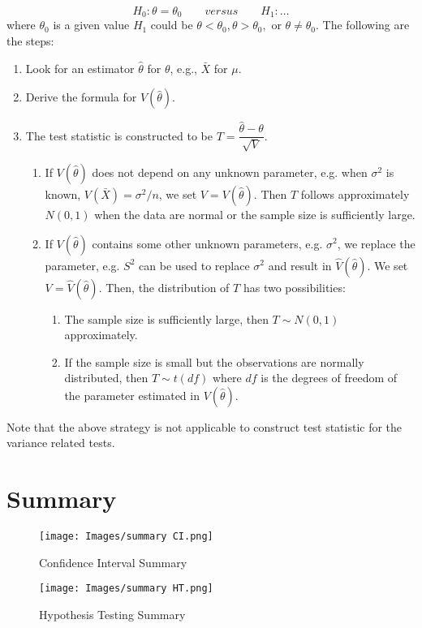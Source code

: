 $$
H_0: \theta = \theta_0 \qquad \textit{versus} \qquad H_1: \dots
$$
where $\theta_0$ is a given value 
$H_1$ could be $\theta < \theta_0, \theta > \theta_0,$ or $\theta \neq \theta_0$. The following are the steps:
\begin{enumerate}
    \item Look for an estimator $\hat{\theta}$ for $\theta$, e.g., $\bar{X}$ for $\mu$.
    \item Derive the formula for $V(\hat{\theta})$.
    \item The test statistic is constructed to be $T = \dfrac{\hat{\theta} - \theta}{\sqrt{V}}$.
    \begin{enumerate}
        \item If $V(\hat{\theta})$ does not depend on any unknown parameter, e.g. when $\sigma^2$ is known, $V(\bar{X}) = \sigma^2/n$, we set $V = V(\hat{\theta})$. Then $T$ follows approximately $N(0,1)$ when the data are normal or the sample size is sufficiently large.
        \item If $V(\hat{\theta})$ contains some other unknown parameters, e.g. $\sigma^2$, we replace the parameter, e.g. $S^2$ can be used to replace $\sigma^2$ and result in $\hat{V}(\hat{\theta})$. We set $V = \hat{V}(\hat{\theta})$. Then, the distribution of $T$ has two possibilities:
        \begin{enumerate}
            \item The sample size is sufficiently large, then $T \sim N(0,1)$ approximately.
            \item If the sample size is small but the observations are normally distributed, then $T \sim t(df)$ where $df$ is the degrees of freedom of the parameter estimated in $V(\hat{\theta})$.
        \end{enumerate}
    \end{enumerate}
\end{enumerate}
Note that the above strategy is not applicable to construct test statistic for the variance related tests.
\section{Summary}
\begin{figure}[h]
    \centering
    \texttt{[image: Images/summary CI.png]}
    \caption{Confidence Interval Summary}
    \label{fig:my_label}
\end{figure}
\begin{figure}[h]
    \centering
    \texttt{[image: Images/summary HT.png]}
    \caption{Hypothesis Testing Summary}
    \label{fig:my_label}
\end{figure}